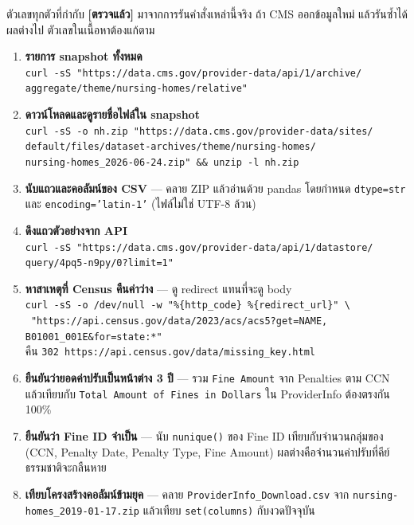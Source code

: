 \documentclass[11pt,a4paper]{article}
\newcommand{\code}[1]{\texttt{#1}}
\newcommand{\ok}{\textcolor{dw}{\textbf{[ตรวจแล้ว]}}}
\begin{document}
ตัวเลขทุกตัวที่กำกับ \ok{} มาจากการรันคำสั่งเหล่านี้จริง ถ้า CMS ออกข้อมูลใหม่
แล้วรันซ้ำได้ผลต่างไป ตัวเลขในเนื้อหาต้องแก้ตาม

\begin{enumerate}
\item \textbf{รายการ snapshot ทั้งหมด} \\
      \code{curl -sS "https://data.cms.gov/provider-data/api/1/archive/} \\
      \code{aggregate/theme/nursing-homes/relative"}
\item \textbf{ดาวน์โหลดและดูรายชื่อไฟล์ใน snapshot} \\
      \code{curl -sS -o nh.zip "https://data.cms.gov/provider-data/sites/} \\
      \code{default/files/dataset-archives/theme/nursing-homes/} \\
      \code{nursing-homes\_2026-06-24.zip" \&\& unzip -l nh.zip}
\item \textbf{นับแถวและคอลัมน์ของ CSV} --- คลาย ZIP แล้วอ่านด้วย pandas
      โดยกำหนด \code{dtype=str} และ \code{encoding='latin-1'}
      (ไฟล์ไม่ใช่ UTF-8 ล้วน)
\item \textbf{ดึงแถวตัวอย่างจาก API} \\
      \code{curl -sS "https://data.cms.gov/provider-data/api/1/datastore/} \\
      \code{query/4pq5-n9py/0?limit=1"}
\item \textbf{หาสาเหตุที่ Census คืนค่าว่าง} --- ดู redirect แทนที่จะดู body \\
      \code{curl -sS -o /dev/null -w "\%\{http_code\} \%\{redirect_url\}" \textbackslash} \\
      \code{\ "https://api.census.gov/data/2023/acs/acs5?get=NAME,} \\
      \code{B01001_001E\&for=state:*"} \\
      คืน \code{302 https://api.census.gov/data/missing_key.html}
\item \textbf{ยืนยันว่ายอดค่าปรับเป็นหน้าต่าง 3 ปี} --- รวม \code{Fine Amount}
      จาก Penalties ตาม CCN แล้วเทียบกับ \code{Total Amount of Fines in Dollars}
      ใน ProviderInfo ต้องตรงกัน 100\%
\item \textbf{ยืนยันว่า Fine ID จำเป็น} --- นับ \code{nunique()} ของ Fine ID
      เทียบกับจำนวนกลุ่มของ (CCN, Penalty Date, Penalty Type, Fine Amount)
      ผลต่างคือจำนวนค่าปรับที่คีย์ธรรมชาติจะกลืนหาย
\item \textbf{เทียบโครงสร้างคอลัมน์ข้ามยุค} --- คลาย
      \code{ProviderInfo_Download.csv} จาก \code{nursing-homes_2019-01-17.zip}
      แล้วเทียบ \code{set(columns)} กับงวดปัจจุบัน
\end{enumerate}
\end{document}
